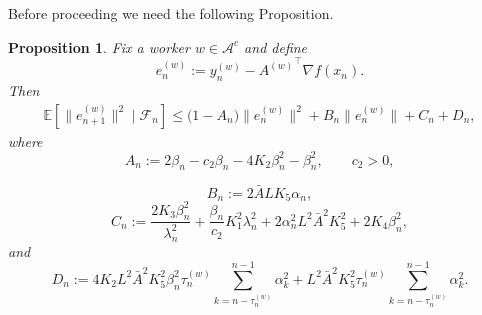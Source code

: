 \documentclass{article}
\newtheorem{proposition}[theorem]{Proposition}
\begin{document}
Before proceeding we need the following Proposition.
\begin{proposition}
\label{prop:enbound}
Fix a worker $w \in \mathcal{A}^c$ and define
\[
e_n^{(w)} := y_n^{(w)} - {A^{(w)}}^\top \nabla f(x_n).
\]
Then
\begin{equation}
\begin{split}
\mathbb{E}\!\left[\|e_{n+1}^{(w)}\|^2 \mid \mathcal{F}_n\right]
\le
\big(1 - A_n\big)\|e_n^{(w)}\|^2
+ B_n \|e_n^{(w)}\|
+ C_n + D_n,
\end{split}
\label{18eq}
\end{equation}
where
\[
A_n := 2\beta_n - c_2 \beta_n - 4 K_2 \beta_n^2 - \beta_n^2, \qquad c_2>0,
\] 

\[
B_n := 2 \bar{A} L K_5 \alpha_n,
\]
\[
C_n :=
\frac{2K_3 \beta_n^2}{\lambda_n^2}
+ \frac{\beta_n}{c_2} K_1^2 \lambda_n^2
+ 2\alpha_n^2 L^2 \bar{A}^2 K_5^2
+ 2K_4 \beta_n^2,
\]
and
\[
D_n :=
4 K_2 L^2 \bar{A}^2 K_5^2 \beta_n^2 \tau_n^{(w)}
\sum_{k=n-\tau_n^{(w)}}^{n-1} \alpha_k^2
+ L^2 \bar{A}^2 K_5^2 \tau_n^{(w)}
\sum_{k=n-\tau_n^{(w)}}^{n-1} \alpha_k^2.
\]
\end{proposition}
\end{document}
